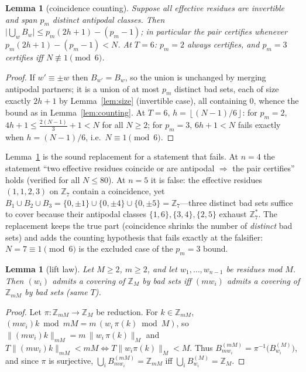 \documentclass[11pt,a4paper]{article}
\numberwithin{equation}{section}
\theoremstyle{plain}
\theoremstyle{plain}
\newtheorem{lemma}[theorem]{Lemma}
\theoremstyle{definition}
\theoremstyle{remark}
\newcommand{\Z}{\mathbb{Z}}
\newcommand{\floor}[1]{\left\lfloor #1 \right\rfloor}
\begin{document}
\begin{lemma}[coincidence counting]\label{lem:D3}
Suppose all effective residues are invertible and span $p_m$ distinct
antipodal classes. Then
$\bigl|\bigcup_w B_w\bigr|\le p_m(2h+1)-(p_m-1)$; in particular the pair
certifies whenever $p_m(2h+1)-(p_m-1)<N$. At $T=6$: $p_m=2$ always
certifies, and $p_m=3$ certifies iff $N\not\equiv 1\pmod 6$.
\end{lemma}

\begin{proof}
If $w'\equiv\pm w$ then $B_{w'}=B_w$, so the union is unchanged by merging
antipodal partners; it is a union of at most $p_m$ distinct bad sets, each
of size exactly $2h+1$ by Lemma~\ref{lem:size} (invertible case), all
containing $0$, whence the bound as in Lemma~\ref{lem:counting}. At $T=6$,
$h=\floor{(N-1)/6}$: for $p_m=2$,
$4h+1\le\tfrac{2(N-1)}{3}+1<N$ for all $N\ge 2$; for $p_m=3$,
$6h+1<N$ fails exactly when $h=(N-1)/6$, i.e.\ $N\equiv1\pmod 6$.
\end{proof}

Lemma~\ref{lem:D3} is the sound replacement for a statement that fails.
At $n=4$ the statement ``two effective
residues coincide or are antipodal $\Rightarrow$ the pair certifies'' holds
(verified for all $N\le 80$). At $n=5$ it is false: the effective residues
$(1,1,2,3)$ on $\Z_7$ contain a coincidence, yet
$B_1\cup B_2\cup B_3=\{0,\pm1\}\cup\{0,\pm4\}\cup\{0,\pm5\}=\Z_7$---three
distinct bad sets suffice to cover because their antipodal classes
$\{1,6\},\{3,4\},\{2,5\}$ exhaust $\Z_7^\ast$. The replacement keeps the
true part (coincidence shrinks the number of \emph{distinct} bad sets) and
adds the counting hypothesis that fails exactly at the falsifier:
$N=7\equiv 1 \pmod 6$ is the excluded case of the $p_m=3$ bound.

\begin{lemma}[lift law]\label{lem:lift}
Let $M\ge 2$, $m\ge 2$, and let $w_1,\dots,w_{n-1}$ be residues mod $M$.
Then $(w_i)$ admits a covering of $\Z_M$ by bad sets iff
$(mw_i)$ admits a covering of $\Z_{mM}$ by bad sets (same $T$).
\end{lemma}

\begin{proof}
Let $\pi:\Z_{mM}\to\Z_M$ be reduction. For $k\in\Z_{mM}$,
$(mw_i)k\bmod mM=m\,(w_i\,\pi(k)\bmod M)$, so
$\lVert (mw_i)k\rVert_{mM}=m\,\lVert w_i\,\pi(k)\rVert_{M}$ and
$T\lVert (mw_i)k\rVert_{mM}<mM\iff T\lVert w_i\pi(k)\rVert_{M}<M$. Thus
$B^{(mM)}_{mw_i}=\pi^{-1}\bigl(B^{(M)}_{w_i}\bigr)$, and since $\pi$ is
surjective, $\bigcup_i B^{(mM)}_{mw_i}=\Z_{mM}$ iff
$\bigcup_i B^{(M)}_{w_i}=\Z_M$.
\end{proof}
\end{document}
